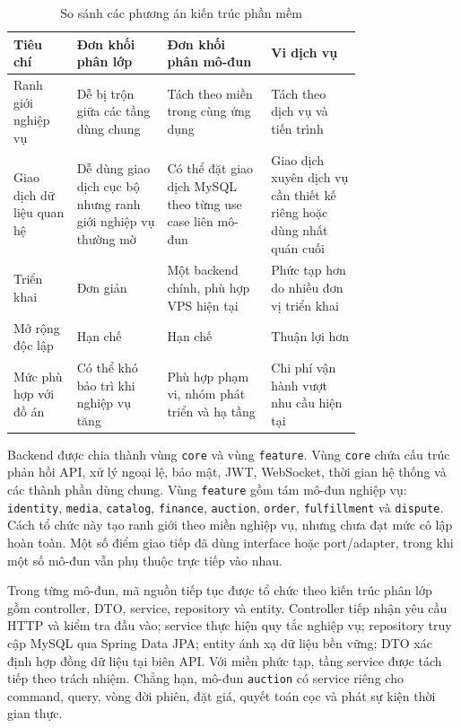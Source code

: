 \documentclass[../DoAn.tex]{subfiles}
\begin{document}
\begin{table}[H]
\centering
\small
\renewcommand{\arraystretch}{1.25}
\begin{tabular}{|>{\raggedright\arraybackslash}p{0.14\linewidth}|
                >{\raggedright\arraybackslash}p{0.20\linewidth}|
                >{\raggedright\arraybackslash}p{0.23\linewidth}|
                >{\raggedright\arraybackslash}p{0.20\linewidth}|}
\hline
\textbf{Tiêu chí} & \textbf{Đơn khối phân lớp} & \textbf{Đơn khối phân mô-đun} & \textbf{Vi dịch vụ} \\ \hline
Ranh giới nghiệp vụ & Dễ bị trộn giữa các tầng dùng chung & Tách theo miền trong cùng ứng dụng & Tách theo dịch vụ và tiến trình \\ \hline
Giao dịch dữ liệu quan hệ & Dễ dùng giao dịch cục bộ nhưng ranh giới nghiệp vụ thường mờ & Có thể đặt giao dịch MySQL theo từng use case liên mô-đun & Giao dịch xuyên dịch vụ cần thiết kế riêng hoặc dùng nhất quán cuối \\ \hline
Triển khai & Đơn giản & Một backend chính, phù hợp VPS hiện tại & Phức tạp hơn do nhiều đơn vị triển khai \\ \hline
Mở rộng độc lập & Hạn chế & Hạn chế & Thuận lợi hơn \\ \hline
Mức phù hợp với đồ án & Có thể khó bảo trì khi nghiệp vụ tăng & Phù hợp phạm vi, nhóm phát triển và hạ tầng & Chi phí vận hành vượt nhu cầu hiện tại \\ \hline
\end{tabular}
\caption{So sánh các phương án kiến trúc phần mềm}
\label{tab:architecture-comparison}
\end{table}

Backend được chia thành vùng \texttt{core} và vùng \texttt{feature}. Vùng \texttt{core} chứa cấu trúc phản hồi API, xử lý ngoại lệ, bảo mật, JWT, WebSocket, thời gian hệ thống và các thành phần dùng chung. Vùng \texttt{feature} gồm tám mô-đun nghiệp vụ: \texttt{identity}, \texttt{media}, \texttt{catalog}, \texttt{finance}, \texttt{auction}, \texttt{order}, \texttt{fulfillment} và \texttt{dispute}. Cách tổ chức này tạo ranh giới theo miền nghiệp vụ, nhưng chưa đạt mức cô lập hoàn toàn. Một số điểm giao tiếp đã dùng interface hoặc port/adapter, trong khi một số mô-đun vẫn phụ thuộc trực tiếp vào nhau.

Trong từng mô-đun, mã nguồn tiếp tục được tổ chức theo kiến trúc phân lớp gồm controller, DTO, service, repository và entity. Controller tiếp nhận yêu cầu HTTP và kiểm tra đầu vào; service thực hiện quy tắc nghiệp vụ; repository truy cập MySQL qua Spring Data JPA; entity ánh xạ dữ liệu bền vững; DTO xác định hợp đồng dữ liệu tại biên API. Với miền phức tạp, tầng service được tách tiếp theo trách nhiệm. Chẳng hạn, mô-đun \texttt{auction} có service riêng cho command, query, vòng đời phiên, đặt giá, quyết toán cọc và phát sự kiện thời gian thực.
\end{document}
